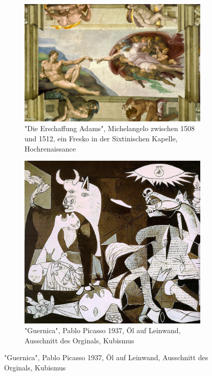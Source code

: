 \begin{figure}
\begin{subfigure}{0.30\textwidth}
      \includegraphics[width=\linewidth]{content/data/Michelangelo_4.jpg}
      \caption{"Die Erschaffung Adams", Michelangelo zwischen 1508 und 1512, ein Fresko in der Sixtinischen Kapelle, Hochrenaissance}
      \label{fig:2}
    \end{subfigure}\hfil %
    \begin{subfigure}{0.30\textwidth}
      \includegraphics[width=\linewidth]{content/data/Pablo_Picasso_270.jpg}
      \caption{"Guernica", Pablo Picasso 1937, Öl auf Leinwand, Ausschnitt des Orginals, Kubismus}
      \label{fig:4}
    \end{subfigure}\hfil %
    \label{fig:bilder_datensatz}
\end{figure}